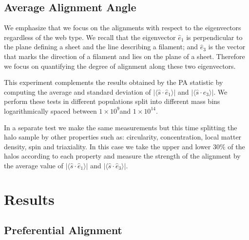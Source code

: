 \documentclass[useAMS,usenatbib]{mn2e}
\newcommand{\hMsun}{{\ifmmode{h^{-1}{\rm
        {M_{\odot}}}}\else{$h^{-1}{\rm{M_{\odot}}}$~}\fi}}
\begin{document}
\subsection{Average Alignment Angle}

We emphasize that we focus on the alignments with respect to the
eigenvectors regardless of the web type. We recall that the
eigenvector $\hat{e}_1$ is perpendicular to the plane defining a sheet
and the line describing a filament; and $\hat{e}_3$ is the vector that
marks the direction of a filament and lies on the plane of a
sheet. Therefore we focus on quantifying the degree of alignment along
these two eigenvectors. 

This experiment complements the results obtained by the PA statistic by
computing the average and standard deviation of
$\vert\langle\hat{s}\cdot\hat{e}_1\rangle\vert$ and
$\vert\langle\hat{s}\cdot\hat{e}_3\rangle\vert$.  We perform these
tests in different populations split into different mass bins
logarithmically spaced between $1\times 10^{9}$\hMsun and
$1\times10^{14}$\hMsun. 

In a separate test we make the same measurements but this time
splitting the halo sample by other properties such as:
circularity, concentration, local matter density, spin and
triaxiality. In this case we take the upper and lower $30\%$ of the
halos according to each property and measure the strength of the
alignment by the average value of
$\vert\langle\hat{s}\cdot\hat{e}_1\rangle\vert$ and
$\vert\langle\hat{s}\cdot\hat{e}_3\rangle\vert$.

\section{Results}
\label{sec:results}


\subsection{Preferential Alignment}
\end{document}
